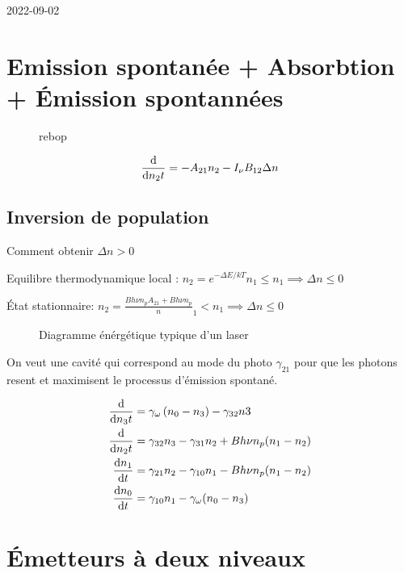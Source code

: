 


2022-09-02

\section*{Emission spontanée + Absorbtion + Émission spontannées}

\begin{figure}[ht]
    \centering
    \caption{rebop}
    \label{fig:rebop}
\end{figure}

$$\dv{n_{2}{t}} = -A_{21} n_2 -I_{\nu} B_{12} \Delta n$$ 

\setcounter{subsection}{4}
\setcounter{section}{1}

\subsection{Inversion de population}
    
Comment obtenir $\Delta n >0$ 

Equilibre thermodynamique local : $n_2 = e^{-\Delta E /kT}n_1 \leq n_1 \implies \Delta n \leq 0$ 

État stationnaire: $n_2 = \frac{Bh\nu{}n_{p}{A_{21}+Bh\nu} n_p}  n_1 < n_1 \implies \Delta n \leq 0$  


\begin{figure}[ht]
    \centering
    \caption{Diagramme énérgétique typique d'un laser}
    \label{fig:diagramme-énérgétique-typique-d'un-laser}
\end{figure}

On veut une cavité qui correspond au mode du photo $\gamma_{21}$ pour que les photons resent  et maximisent le processus d'émission spontané.



\begin{align*}
    \dv{n_{3}{t}} &= \gamma_{\omega} \left( n_0 -n_3 \right) -\gamma_{32} n3\\ \dv{n_{2}{t}} &= \gamma_{32} n_3 - \gamma_{31} n_2 + Bh \nu n_p (n_1 - n_2 ) \\ \dv{n_1 }{t} &= \gamma_{21} n_2 -\gamma_{10} n_1 - B h\nu n_p (n_1 -n_2 )\\ \dv{n_0 }{t} &= \gamma_{10} n_1 - \gamma_{\omega} (n_0 -n_3)
\end{align*}


\section{Émetteurs à deux niveaux}

